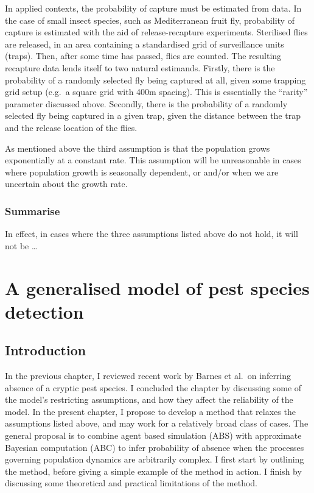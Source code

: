 \documentclass[
]{book}
\begin{document}
In applied contexts, the probability of capture must be estimated from data. In the case of small insect species, such as Mediterranean fruit fly, probability of capture is estimated with the aid of release-recapture experiments. Sterilised flies are released, in an area containing a standardised grid of surveillance units (traps). Then, after some time has passed, flies are counted. The resulting recapture data lends itself to two natural estimands. Firstly, there is the probability of a randomly selected fly being captured at all, given some trapping grid setup (e.g.~a square grid with 400m spacing). This is essentially the ``rarity'' parameter discussed above. Secondly, there is the probability of a randomly selected fly being captured in a given trap, given the distance between the trap and the release location of the flies.

As mentioned above the third assumption is that the population grows exponentially at a constant rate. This assumption will be unreasonable in cases where population growth is seasonally dependent, or and/or when we are uncertain about the growth rate.

\hypertarget{summarise}{%
\subsection{Summarise}\label{summarise}}

In effect, in cases where the three assumptions listed above do not hold, it will not be \ldots{}

\hypertarget{a-generalised-model-of-pest-species-detection}{%
\chapter{A generalised model of pest species detection}\label{a-generalised-model-of-pest-species-detection}}

\hypertarget{introduction-1}{%
\section{Introduction}\label{introduction-1}}

In the previous chapter, I reviewed recent work by Barnes et al.~on inferring absence of a cryptic pest species. I concluded the chapter by discussing some of the model's restricting assumptions, and how they affect the reliability of the model. In the present chapter, I propose to develop a method that relaxes the assumptions listed above, and may work for a relatively broad class of cases. The general proposal is to combine agent based simulation (ABS) with approximate Bayesian computation (ABC) to infer probability of absence when the processes governing population dynamics are arbitrarily complex. I first start by outlining the method, before giving a simple example of the method in action. I finish by discussing some theoretical and practical limitations of the method.
\end{document}
